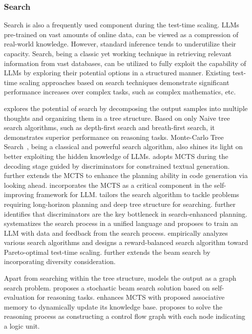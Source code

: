 
\subsubsection{Search}
\label{subsec:search}

Search is also a frequently used component during the test-time scaling. LLMs pre-trained on vast amounts of online data, can be viewed as a compression of real-world knowledge. However, standard inference tends to underutilize their capacity. Search, being a classic yet working technique in retrieving relevant information from vast databases, can be utilized to fully exploit the capability of LLMs by exploring their potential options in a structured manner. Existing test-time scaling approaches based on search techniques demonstrate significant performance increases over complex tasks, such as complex mathematics, etc.

\citet{yao2023tree} explores the potential of search by decomposing the output samples into multiple thoughts and organizing them in a tree structure. Based on only Naive tree search algorithms, such as depth-first search and breath-first search, it demonstrates superior performance on reasoning tasks. 
Monte-Carlo Tree Search~\citep{coulom2006efficient}, being a classical and powerful search algorithm, also shines its light on better exploiting the hidden knowledge of LLMs.
\citet{chaffin2022ppl} adopts MCTS during the decoding stage guided by discriminators for constrained textual generation.
\citet{zhang2023planning} further extends the MCTS to enhance the planning ability in code generation via looking ahead.
\citet{tian2024toward} incorporates the MCTS as a critical component in the self-improving framework for LLM.
\citet{wan2024alphazero} tailors the search algorithm to tackle problems requiring long-horizon planning and deep tree structure for searching.
\citet{chen2024tree} further identifies that discriminators are the key bottleneck in search-enhanced planning.
\citet{gandhi2024streams} systematizes the search process in a unified language and proposes to train an LLM with data and feedback from the search process.
\citet{wu2024scaling} empirically analyzes various search algorithms and designs a reward-balanced search algorithm toward Pareto-optimal test-time scaling.
\citet{beenching2024scaling} further extends the beam search by incorporating diversity consideration.

Apart from searching within the tree structure, \citet{Besta2024graph} models the output as a graph search problem.
\citet{xie2023selfevaluation} proposes a stochastic beam search solution based on self-evaluation for reasoning tasks.
\citet{pan2025coatchainofassociatedthoughtsframeworkenhancing} enhances MCTS with proposed associative memory to dynamically update its knowledge base.
\citet{li2025reasoningaslogicunitsscalingtesttimereasoning} proposes to solve the reasoning process as constructing a control flow graph with each node indicating a logic unit.

